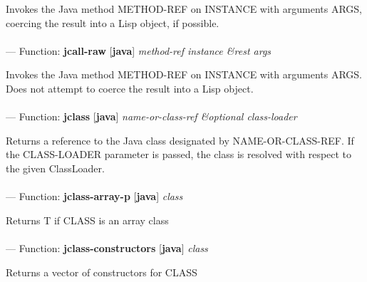 \begin{adjustwidth}{5em}{5em}
Invokes the Java method METHOD-REF on INSTANCE with arguments ARGS, coercing the result into a Lisp object, if possible.
\end{adjustwidth}

\paragraph{}
\label{JAVA:JCALL-RAW}
--- Function: \textbf{jcall-raw} [\textbf{java}] \textit{method-ref instance \&rest args}

\begin{adjustwidth}{5em}{5em}
Invokes the Java method METHOD-REF on INSTANCE with arguments ARGS. Does not attempt to coerce the result into a Lisp object.
\end{adjustwidth}

\paragraph{}
\label{JAVA:JCLASS}
--- Function: \textbf{jclass} [\textbf{java}] \textit{name-or-class-ref \&optional class-loader}

\begin{adjustwidth}{5em}{5em}
Returns a reference to the Java class designated by NAME-OR-CLASS-REF. If the CLASS-LOADER parameter is passed, the class is resolved with respect to the given ClassLoader.
\end{adjustwidth}

\paragraph{}
\label{JAVA:JCLASS-ARRAY-P}
--- Function: \textbf{jclass-array-p} [\textbf{java}] \textit{class}

\begin{adjustwidth}{5em}{5em}
Returns T if CLASS is an array class
\end{adjustwidth}

\paragraph{}
\label{JAVA:JCLASS-CONSTRUCTORS}
--- Function: \textbf{jclass-constructors} [\textbf{java}] \textit{class}

\begin{adjustwidth}{5em}{5em}
Returns a vector of constructors for CLASS
\end{adjustwidth}

